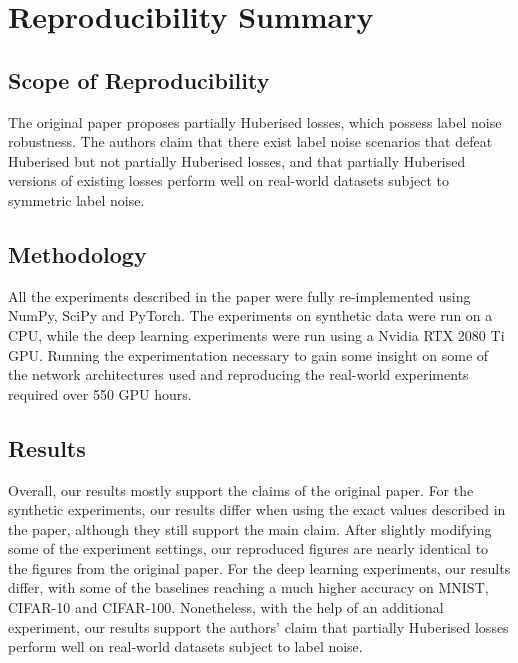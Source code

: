 
\section*{\centering Reproducibility Summary}

\subsection*{Scope of Reproducibility}

The original paper proposes partially Huberised losses, which possess label noise robustness. The authors claim that there exist label noise scenarios that defeat Huberised but not partially Huberised losses, and that partially Huberised versions of existing losses perform well on real-world datasets subject to symmetric label noise.


\subsection*{Methodology}

All the experiments described in the paper were fully re-implemented using NumPy, SciPy and PyTorch. The experiments on synthetic data were run on a CPU, while the deep learning experiments were run using a Nvidia RTX 2080 Ti GPU. Running the experimentation necessary to gain some insight on some of the network architectures used and reproducing the real-world experiments required over 550 GPU hours.


\subsection*{Results}

Overall, our results mostly support the claims of the original paper. For the synthetic experiments, our results differ when using the exact values described in the paper, although they still support the main claim. After slightly modifying some of the experiment settings, our reproduced figures are nearly identical to the figures from the original paper. For the deep learning experiments, our results differ, with some of the baselines reaching a much higher accuracy on MNIST, CIFAR-10 and CIFAR-100. Nonetheless, with the help of an additional experiment, our results support the authors' claim that partially Huberised losses perform well on real-world datasets subject to label noise.


